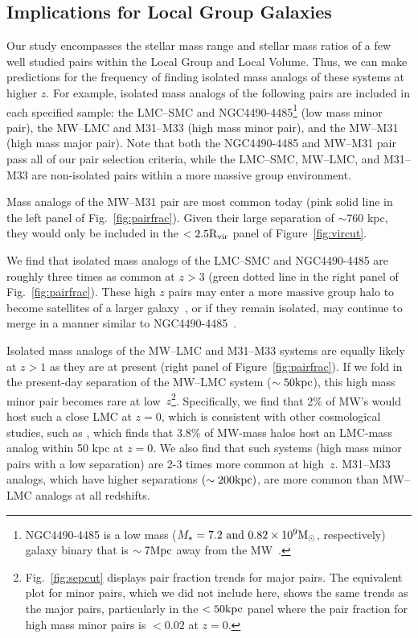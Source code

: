 \documentclass[twocolumn]{aastex631}
\newcommand{\Rvir}{\ensuremath{\rm R_{vir}}}
\begin{document}
   \subsection{Implications for Local Group Galaxies}\label{sec:disc-LG}
    Our study encompasses the stellar mass range and stellar mass ratios of a few well studied pairs within the Local Group and Local Volume.
    Thus, we can make predictions for the frequency of finding isolated mass analogs of these systems at higher $z$. 
    For example, isolated mass analogs of the following pairs are included in each specified sample:
    the LMC--SMC and NGC4490-4485\footnote{NGC4490-4485 is a low mass ($M_* = 7.2 \mbox{ and } 0.82 \times 10^9\mathrm{M}_\odot$, respectively) galaxy binary that is $\sim7\mathrm{Mpc}$ away from the MW~\citep{Theureau2007,Pearson2018}.} (low mass minor pair), the MW--LMC and M31--M33 (high mass minor pair), and the MW--M31 (high mass major pair).
    Note that both the NGC4490-4485 and MW--M31 pair pass all of our pair selection criteria, while the LMC--SMC,  MW--LMC, and M31--M33 are non-isolated pairs within a more massive group environment.

    Mass analogs of the MW--M31 pair are most common today (pink solid line in the left panel of Fig.~\ref{fig:pairfrac}). 
    Given their large separation of $\sim$760 kpc, they would only be included in the $<2.5\Rvir$ panel of Figure~\ref{fig:vircut}. 

    We find that isolated mass analogs of the LMC--SMC and NGC4490-4485 are roughly three times as common at $z>3$ (green dotted line in the right panel of Fig.~\ref{fig:pairfrac}). 
    These high $z$ pairs may enter a more massive group halo to become satellites of a larger galaxy~\citep[like the LMC--SMC, ][]{Besla2007,Patel2017a-Orbits}, or if they remain isolated, may continue to merge in a manner similar to NGC4490-4485~\citep{Pearson2018}. 
    
    Isolated mass analogs of the MW--LMC and M31--M33 systems are equally likely at $z>1$ as they are at present (right panel of Figure~\ref{fig:pairfrac}). 
    If we fold in the present-day separation of the MW--LMC system ($\sim50 \mathrm{kpc}$), this high mass minor pair becomes rare at low~$z$\footnote{Fig.~\ref{fig:sepcut} displays pair fraction trends for major pairs. The equivalent plot for minor pairs, which we did not include here, shows the same trends as the major pairs, particularly in the $<50\mathrm{kpc}$ panel where the pair fraction for high mass minor pairs is $<0.02$ at $z=0$.}. Specifically, we find that 2\% of MW's would host such a close LMC at $z=0$, which is consistent with other cosmological studies, such as \citet{Patel2017a-Orbits}, which finds that 3.8\% of MW-mass halos host an LMC-mass analog within 50 kpc at $z=0$. 
    We also find that such systems (high mass minor pairs with a low separation) are 2-3 times more common at high~$z$. M31--M33 analogs, which have higher separations $(\sim200\mathrm{kpc})$, are more common than MW--LMC analogs at all redshifts.  
\end{document}
